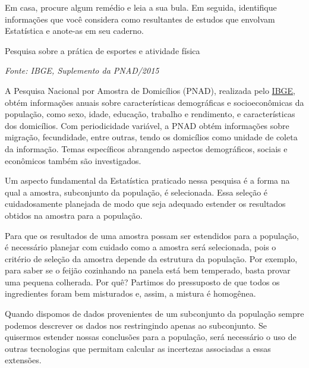 \clearpage

\begin{reflection}

Em casa, procure algum remédio e leia a sua bula. Em seguida, identifique informações que você considera como resultantes de estudos que envolvam Estatística e anote-as em seu caderno.

\end{reflection}


\label{est1-ativ-3}
\begin{task}{ Pesquisa sobre a prática de esportes e atividade física}

\emph{Fonte: IBGE, Suplemento da PNAD/2015}

A Pesquisa Nacional por Amostra de Domicílios (PNAD), realizada pelo \href{https://www.ibge.gov.br/estatisticas-novoportal/sociais/populacao/9127-pesquisa-nacional-por-amostra-de-domicilios.html}{IBGE}, obtém informações anuais sobre características demográficas e socioeconômicas da população, como sexo, idade, educação, trabalho e rendimento, e características dos domicílios. Com periodicidade variável, a PNAD obtém informações sobre migração, fecundidade, entre outras, tendo os domicílios como unidade de coleta da informação. Temas específicos abrangendo aspectos demográficos, sociais e econômicos também são investigados.

Um aspecto fundamental da Estatística praticado nessa pesquisa é a forma na qual a amostra, subconjunto da população, é selecionada. Essa seleção é cuidadosamente planejada de modo que seja adequado estender os resultados obtidos na amostra para a população.

Para que os resultados de uma amostra possam ser estendidos para a população, é necessário planejar com cuidado como a amostra será selecionada, pois o critério de seleção da amostra depende da estrutura da população. Por exemplo, para saber se o feijão cozinhando na panela está bem temperado, basta provar uma pequena colherada. Por quê?  Partimos do pressuposto de que todos os ingredientes foram bem misturados e, assim, a mistura é homogênea.

Quando dispomos de dados provenientes de um subconjunto da população sempre podemos descrever os dados nos restringindo apenas ao subconjunto. Se quisermos estender nossas conclusões para a população, será necessário o uso de outras tecnologias que permitam calcular as incertezas associadas a essas extensões.


\end{task}
